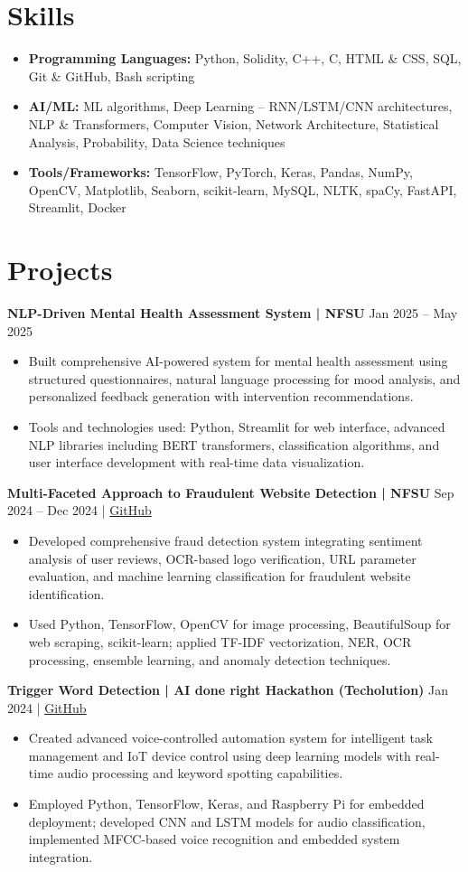 \documentclass[a4paper,11pt]{article}
\newcommand{\resumeItem}[2]{\item{\textbf{#1}{\hspace{0.5mm}#2}}}
\newcommand{\resumeSubItem}[2]{\resumeItem{#1}{#2}\vspace{-2pt}}
\newcommand{\resumeHeadingSkillStart}{\begin{itemize}[leftmargin=*,itemsep=1.5mm, rightmargin=2ex]}
\newcommand{\resumeItemListStart}{\begin{itemize}[leftmargin=*,labelsep=1mm,itemsep=0pt,topsep=2pt]}
\newcommand{\resumeHeadingSkillEnd}{\end{itemize}\vspace{-2mm}}
\newcommand{\resumeItemListEnd}{\end{itemize}\vspace{1mm}}
\begin{document}
\section{\textbf{Skills}}
\resumeHeadingSkillStart
\resumeSubItem{Programming Languages: }{Python, Solidity, C++, C, HTML \& CSS, SQL, Git \& GitHub, Bash scripting}
\resumeSubItem{AI/ML: }{ML algorithms, Deep Learning – RNN/LSTM/CNN architectures, NLP \& Transformers, Computer Vision, Network Architecture, Statistical Analysis, Probability, Data Science techniques}

\resumeSubItem{Tools/Frameworks: }{TensorFlow, PyTorch, Keras, Pandas, NumPy, OpenCV, Matplotlib, Seaborn, scikit-learn, MySQL, NLTK, spaCy, FastAPI, Streamlit, Docker}

\resumeHeadingSkillEnd

\section{\textbf{Projects}}
\textbf{NLP-Driven Mental Health Assessment System | NFSU} \hfill Jan 2025 -- May 2025
\resumeItemListStart
\item Built comprehensive AI-powered system for mental health assessment using structured questionnaires, natural language processing for mood analysis, and personalized feedback generation with intervention recommendations.
\item Tools and technologies used: Python, Streamlit for web interface, advanced NLP libraries including BERT transformers, classification algorithms, and user interface development with real-time data visualization.
\resumeItemListEnd

\textbf{Multi-Faceted Approach to Fraudulent Website Detection | NFSU} \hfill Sep 2024 -- Dec 2024 | \href{https://github.com/MIHIR-RANJAN/A_Multi_Faceted_Approach_to_Fraudulent_Website_Detection.git}{GitHub}
\resumeItemListStart
\item Developed comprehensive fraud detection system integrating sentiment analysis of user reviews, OCR-based logo verification, URL parameter evaluation, and machine learning classification for fraudulent website identification.
\item Used Python, TensorFlow, OpenCV for image processing, BeautifulSoup for web scraping, scikit-learn; applied TF-IDF vectorization, NER, OCR processing, ensemble learning, and anomaly detection techniques.
\resumeItemListEnd

\textbf{Trigger Word Detection | AI done right Hackathon (Techolution)} \hfill Jan 2024 | \href{https://github.com/MIHIR-RANJAN/Trigger_Word_Detection_AiDoneRight.git}{GitHub}
\resumeItemListStart
\item Created advanced voice-controlled automation system for intelligent task management and IoT device control using deep learning models with real-time audio processing and keyword spotting capabilities.
\item Employed Python, TensorFlow, Keras, and Raspberry Pi for embedded deployment; developed CNN and LSTM models for audio classification, implemented MFCC-based voice recognition and embedded system integration.
\resumeItemListEnd
\end{document}
